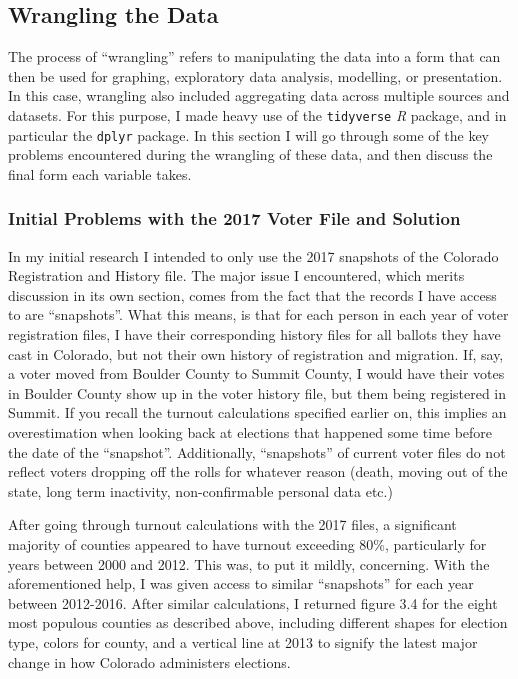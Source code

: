 \documentclass[]{article}
\begin{document}
\subsection{Wrangling the Data}\label{wrangling-the-data}

The process of ``wrangling'' refers to manipulating the data into a form
that can then be used for graphing, exploratory data analysis,
modelling, or presentation. In this case, wrangling also included
aggregating data across multiple sources and datasets. For this purpose,
I made heavy use of the \texttt{tidyverse} \textit{R} package, and in
particular the \texttt{dplyr} package. In this section I will go through
some of the key problems encountered during the wrangling of these data,
and then discuss the final form each variable takes.

\subsubsection{Initial Problems with the 2017 Voter File and
Solution}\label{initial-problems-with-the-2017-voter-file-and-solution}

In my initial research I intended to only use the 2017 snapshots of the
Colorado Registration and History file. The major issue I encountered,
which merits discussion in its own section, comes from the fact that the
records I have access to are ``snapshots''. What this means, is that for
each person in each year of voter registration files, I have their
corresponding history files for all ballots they have cast in Colorado,
but not their own history of registration and migration. If, say, a
voter moved from Boulder County to Summit County, I would have their
votes in Boulder County show up in the voter history file, but them
being registered in Summit. If you recall the turnout calculations
specified earlier on, this implies an overestimation when looking back
at elections that happened some time before the date of the
``snapshot''. Additionally, ``snapshots'' of current voter files do not
reflect voters dropping off the rolls for whatever reason (death, moving
out of the state, long term inactivity, non-confirmable personal data
etc.)

After going through turnout calculations with the 2017 files, a
significant majority of counties appeared to have turnout exceeding
80\%, particularly for years between 2000 and 2012. This was, to put it
mildly, concerning. With the aforementioned help, I was given access to
similar ``snapshots'' for each year between 2012-2016. After similar
calculations, I returned figure 3.4 for the eight most populous counties
as described above, including different shapes for election type, colors
for county, and a vertical line at 2013 to signify the latest major
change in how Colorado administers elections.
\end{document}
